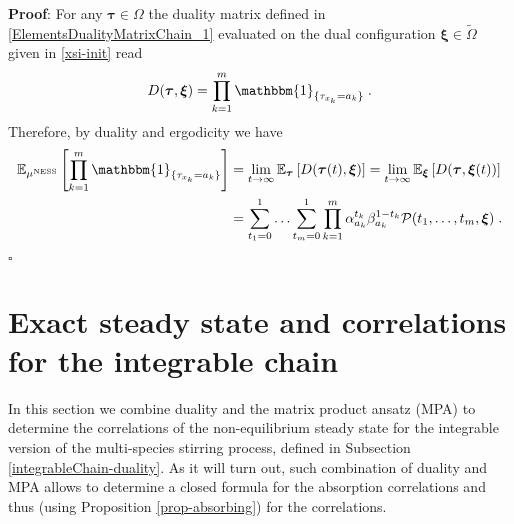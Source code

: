 \documentclass[10pt]{article}
\numberwithin{equation}{section}
\numberwithin{equation}{subsection}
\newcommand{\dt}{\;.}
\begin{document}
\textbf{Proof}:
For any $\bm{\tau}\in \Omega$ the duality matrix defined in \eqref{ElementsDualityMatrixChain_1} evaluated on the dual configuration $\bm{\xi}\in\widetilde{\Omega}$ given in \eqref{xsi-init} read
\begin{equation}
	D(\bm{\tau},\bm{\xi})%
	=\prod_{k=1}^{m}\mathbbm{1}_{\{\tau_{x_{k}}=a_{k}\}}\dt
\end{equation}
Therefore, by duality and ergodicity we have 
\begin{equation}\label{CorrelationByABS-prob}
	\begin{split}
\mathbb{E}_{\mu^{\text{NESS}}}\left[\prod_{k=1}^{m}\mathbbm{1}_{\{\tau_{x_{k}}=a_{k}\}}\right]&=\lim_{t\to \infty}\mathbb{E}_{\bm{\tau}}\left[D(\bm{\tau}(t),\bm{{\xi}})\right]=\lim_{t\to \infty}\mathbb{E}_{\bm{\xi}}\left[D(\bm{\tau},\bm{{\xi}}(t))\right]
	\\&=\sum_{t_{1}=0}^{1}\ldots \sum_{t_{m}=0}^{1}\prod_{k=1}^{m}\alpha_{a_{k}}^{t_{k}}\beta_{a_{k}}^{1-t_{k}}\mathcal{P}(t_{1},\ldots,t_{m},\bm{\xi})\dt
\end{split}
\end{equation}
\begin{flushright}
	$\square$
\end{flushright} 







\section{Exact steady state and correlations for the integrable chain}\label{sectionIntegrabiliy}
In this section we combine duality and the matrix product ansatz (MPA) to determine the correlations of the non-equilibrium steady state for the integrable version of the multi-species stirring process, defined in Subsection \ref{integrableChain-duality}. As it will turn out, such combination of duality and MPA allows to determine a closed formula for the absorption correlations and thus (using Proposition \ref{prop-absorbing}) for the correlations.
\end{document}
